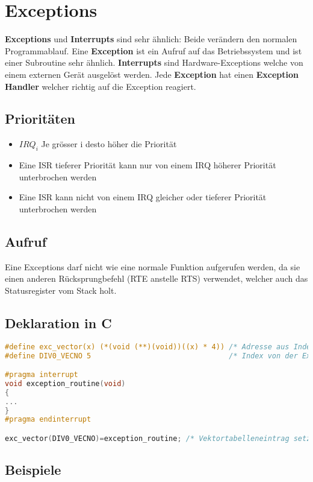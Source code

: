 \section{Exceptions}
\textbf{Exceptions} und \textbf{Interrupts} sind sehr ähnlich: Beide verändern den normalen Programmablauf.
Eine \textbf{Exception} ist ein Aufruf auf das Betriebssystem und ist einer Subroutine sehr ähnlich. 
\textbf{Interrupts} sind Hardware-Exceptions welche von einem externen Gerät ausgelöst werden.
Jede \textbf{Exception} hat einen \textbf{Exception Handler} welcher richtig auf die Exception reagiert.
\subsection{Prioritäten}
\begin{itemize}
	\item $IRQ_i$ Je grösser i desto höher die Priorität
	\item Eine ISR tieferer Priorität kann nur von einem IRQ höherer Priorität unterbrochen werden
	\item Eine ISR kann nicht von einem IRQ gleicher oder tieferer Priorität unterbrochen werden
\end{itemize}
\subsection{Aufruf}
Eine Exceptions darf nicht wie eine normale Funktion aufgerufen werden, da sie einen anderen Rücksprungbefehl (RTE anstelle RTS) verwendet, welcher auch das Statusregister vom Stack holt.

\subsection{Deklaration in C}

\begin{lstlisting}[language=C]
#define exc_vector(x) (*(void (**)(void))((x) * 4)) /* Adresse aus Index berechnen */
#define DIV0_VECNO 5                                /* Index von der Exception Vector Assignment */

#pragma interrupt
void exception_routine(void)
{
...
}
#pragma endinterrupt

exc_vector(DIV0_VECNO)=exception_routine; /* Vektortabelleneintrag setzen exc_div0 ist ein funktionsname*/
\end{lstlisting}

\subsection{Beispiele} 

